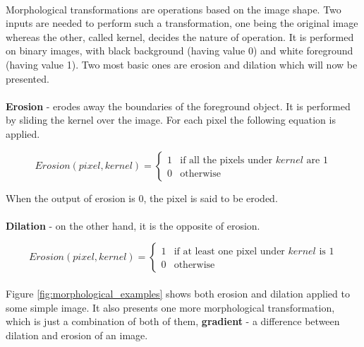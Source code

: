 \paragraph{}
Morphological transformations are operations based on the image shape. Two inputs are needed to perform such a transformation, one being the original image whereas the other, called kernel, decides the nature of operation. It is performed on binary images, with black background (having value 0) and white foreground (having value 1). Two most basic ones are erosion and dilation which will now be presented.

\paragraph{}
\textbf{Erosion} - erodes away the boundaries of the foreground object. It is performed by sliding the kernel over the image. For each pixel the following equation is applied.

\begin{equation}
	Erosion(pixel, kernel) = \begin{cases}
		1 & \text{if all the pixels under $kernel$ are 1}\\
		0 & \text{otherwise}
	\end{cases}
\end{equation}

When the output of erosion is 0, the pixel is said to be eroded.

\paragraph{}
\textbf{Dilation} - on the other hand, it is the opposite of erosion. 

\begin{equation}
	Erosion(pixel, kernel) = \begin{cases}
		1 & \text{if at least one pixel under $kernel$ is 1}\\
		0 & \text{otherwise}
	\end{cases}
\end{equation}

\paragraph{}
Figure \ref{fig:morphological_examples} shows both erosion and dilation applied to some simple image. It also presents one more morphological transformation, which is just a combination of both of them, \textbf{gradient} - a difference between dilation and erosion of an image.

